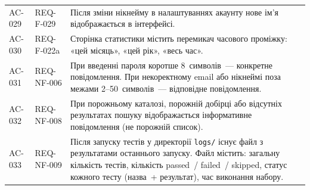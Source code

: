 \begin{longtable}{L{2cm} L{2.5cm} L{9.5cm}}
\addlinespace
AC-029 & REQ-F-029 & Після зміни нікнейму в налаштуваннях акаунту нове ім'я відображається в інтерфейсі.  \\
\addlinespace
AC-030 & REQ-F-022a & Сторінка статистики містить перемикач часового проміжку: «цей місяць», «цей рік», «весь час».  \\
\addlinespace
AC-031 & REQ-NF-006 & При введенні пароля коротше 8~символів~--- конкретне повідомлення. При некоректному email або нікнеймі поза межами 2–50~символів~--- відповідне повідомлення.  \\
\addlinespace
AC-032 & REQ-NF-008 & При порожньому каталозі, порожній добірці або відсутніх результатах пошуку відображається інформативне повідомлення (не порожній список).  \\
\addlinespace
AC-033 & REQ-NF-009 & Після запуску тестів у директорії \texttt{logs/} існує файл з результатами останнього запуску. Файл містить: загальну кількість тестів, кількість passed~/ failed~/ skipped, статус кожного тесту (назва~+ результат), час виконання набору.  \\

\end{longtable}
